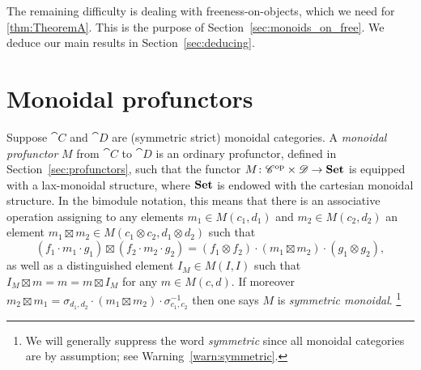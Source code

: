\documentclass[11pt,oneside,article]{memoir}
\begin{document}
The remaining difficulty is dealing with freeness-on-objects, which we need for \ref{thm:TheoremA}. This is the purpose of Section~\ref{sec:monoids_on_free}. We deduce our main results in Section~\ref{sec:deducing}.


\section{Monoidal profunctors}\label{sec:monoidal_profunctors}

Suppose $\cat{C}$ and $\cat{D}$ are (symmetric strict) monoidal categories. A \emph{monoidal
profunctor} $M$ from $\cat{C}$ to $\cat{D}$ is an ordinary profunctor, defined in
Section~\ref{sec:profunctors}, such that the functor $M\colon {\mathscr{C}}^{\text{op}}\times\mathscr{D}\to\mathbf{Set}$ is
equipped with a lax-monoidal structure, where $\mathbf{Set}$ is endowed with the cartesian monoidal
structure. In the bimodule notation, this means that there is an associative operation assigning to
any elements $m_1\in M(c_1,d_1)$ and $m_2\in M(c_2,d_2)$ an element $m_1\boxtimes m_2\in
M(c_1\otimes c_2,d_1\otimes d_2)$ such that
\[
   (f_1\cdot m_1\cdot g_1)\boxtimes(f_2\cdot m_2\cdot g_2) = (f_1\otimes f_2)\cdot(m_1\boxtimes m_2)\cdot(g_1\otimes g_2),
\]
as well as a distinguished element $I_M\in M(I,I)$ such that $I_M\boxtimes m = m = m\boxtimes I_M$
for any $m\in M(c,d)$. If moreover $m_2\boxtimes m_1 = \sigma_{d_1,d_2}\cdot(m_1\boxtimes
m_2)\cdot\sigma_{c_1,c_2}^{-1}$ then one says $M$ is \emph{symmetric monoidal}.%
\footnote{
   We will generally suppress the word \emph{symmetric} since all monoidal categories are by
   assumption; see Warning~\ref{warn:symmetric}.
}
\end{document}
